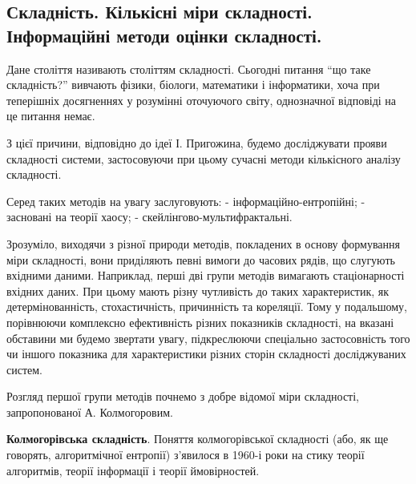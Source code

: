 \documentclass[
  letterpaper,
]{report}
\begin{document}
\hypertarget{ux441ux43aux43bux430ux434ux43dux456ux441ux442ux44c.-ux43aux456ux43bux44cux43aux456ux441ux43dux456-ux43cux456ux440ux438-ux441ux43aux43bux430ux434ux43dux43eux441ux442ux456.-ux456ux43dux444ux43eux440ux43cux430ux446ux456ux439ux43dux456-ux43cux435ux442ux43eux434ux438-ux43eux446ux456ux43dux43aux438-ux441ux43aux43bux430ux434ux43dux43eux441ux442ux456.}{%
\subsection{Складність. Кількісні міри складності. Інформаційні методи
оцінки
складності.}\label{ux441ux43aux43bux430ux434ux43dux456ux441ux442ux44c.-ux43aux456ux43bux44cux43aux456ux441ux43dux456-ux43cux456ux440ux438-ux441ux43aux43bux430ux434ux43dux43eux441ux442ux456.-ux456ux43dux444ux43eux440ux43cux430ux446ux456ux439ux43dux456-ux43cux435ux442ux43eux434ux438-ux43eux446ux456ux43dux43aux438-ux441ux43aux43bux430ux434ux43dux43eux441ux442ux456.}}

Дане століття називають століттям складності. Сьогодні питання ``що таке
складність?'' вивчають фізики, біологи, математики і інформатики, хоча
при теперішніх досягненнях у розумінні оточуючого світу, однозначної
відповіді на це питання немає.

З цієї причини, відповідно до ідеї І. Пригожина, будемо досліджувати
прояви складності системи, застосовуючи при цьому сучасні методи
кількісного аналізу складності.

Серед таких методів на увагу заслуговують: - інформаційно-ентропійні; -
засновані на теорії хаосу; - скейлінгово-мультифрактальні.

Зрозуміло, виходячи з різної природи методів, покладених в основу
формування міри складності, вони приділяють певні вимоги до часових
рядів, що слугують вхідними даними. Наприклад, перші дві групи методів
вимагають стаціонарності вхідних даних. При цьому мають різну чутливість
до таких характеристик, як детермінованність, стохастичність,
причинність та кореляції. Тому у подальшому, порівнюючи комплексно
ефективність різних показників складності, на вказані обставини ми
будемо звертати увагу, підкреслюючи спеціально застосовність того чи
іншого показника для характеристики різних сторін складності
досліджуваних систем.

Розгляд першої групи методів почнемо з добре відомої міри складності,
запропонованої А. Колмогоровим.

\textbf{Колмогорівська складність}. Поняття колмогорівської складності
(або, як ще говорять, алгоритмічної ентропії) з'явилося в 1960-і роки на
стику теорії алгоритмів, теорії інформації і теорії ймовірностей.
\end{document}
